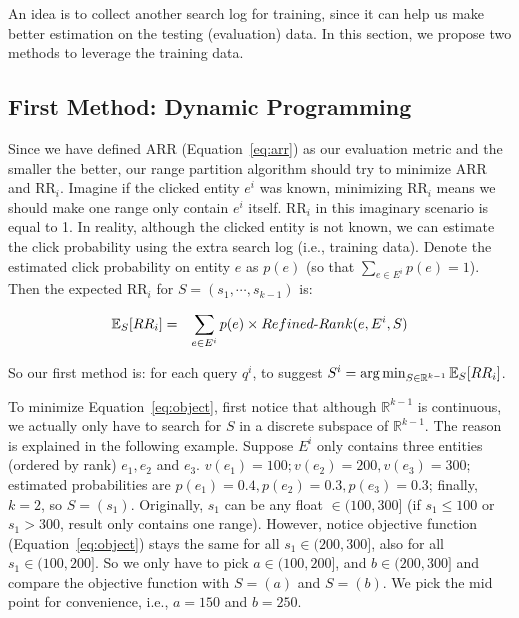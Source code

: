 An idea is to collect another search log for training, since it can help us make better estimation on the testing (evaluation) data. In this section, we propose two methods to leverage the training data. 

\subsection{First Method: Dynamic Programming}
\label{ch2:dp}
Since we have defined ARR (Equation~\ref{eq:arr}) as our evaluation metric and the smaller the better, our range partition algorithm should try to minimize ARR and RR$_i$. Imagine if the clicked entity $e^i$ was known, minimizing RR$_i$ means we should make one range only contain $e^i$ itself. RR$_i$ in this imaginary scenario is equal to 1. In reality, although the clicked entity is not known, we can estimate the click probability using the extra search log (i.e., training data). Denote the estimated click probability on entity $e$ as $p(e)$ (so that $\sum_{e\in E^i} p(e) = 1$). Then the expected RR$_i$ for $S=(s_1, \cdots, s_{k-1})$ is:

\vspace{-0.09in}
\begin{eqnarray}
\mathbb{E}_{S}[RR_i] &=& \sum_{e\in E^i} p(e) \times \mathop{\mbox{$Refined$-$Rank$}}(e, E^i, S)\label{eq:object}
\end{eqnarray}
\vspace{-0.09in}

So our first method is: for each query $q^i$, to suggest $S^i=\operatorname*{arg\,min}_{S\in \mathbb{R}^{k-1}} \mathbb{E}_{S}[RR_i]$.  

To minimize Equation~\ref{eq:object}, first notice that although $\mathbb{R}^{k-1}$ is continuous, we actually only have to search for $S$ in a discrete subspace of $\mathbb{R}^{k-1}$. The reason is explained in the following example. Suppose $E^i$ only contains three entities (ordered by rank) $e_1,e_2$ and $e_3$. $v(e_1)=100; v(e_2)=200, v(e_3)=300$; estimated probabilities are $p(e_1) = 0.4,\allowbreak p(e_2) = 0.3, \allowbreak p(e_3) = 0.3$; finally, $k=2$, so $S=(s_1)$. Originally, $s_1$ can be any float $\in (100, 300]$ (if $s_1\leq 100$ or $s_1 > 300$, result only contains one range). However, notice objective function (Equation~\ref{eq:object}) stays the same for all $s_1\in (200, 300]$, also for all $s_1\in (100, 200]$. So we only have to pick $a\in(100, 200]$, and $b\in(200, 300]$ and compare the objective function with $S=(a)$ and $S=(b)$. We pick the mid point for convenience, i.e., $a=150$ and $b=250$.

